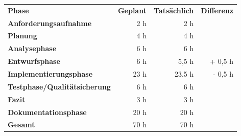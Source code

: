 \begin{tabu}{lrrr}
\rowfont{\bfseries\leavevmode\color{headingfont}}\textbf{Phase} & \textbf{Geplant} & \textbf{Tatsächlich} & \textbf{Differenz} \\
\textbf{Anforderungsaufnahme} & 2 h & 2 h & \\
\textbf{Planung} & 4 h & 4 h & \\ 
\textbf{Analysephase} & 6 h & 6 h  &  \\
\textbf{Entwurfsphase} & 6 h & 5,5 h & + 0,5 h \\
\textbf{Implementierungsphase} & 23 h  & 23.5 h  & - 0,5 h \\
\textbf{Testphase/Qualitätsicherung} & 6 h & 6 h & \\
\textbf{Fazit} & 3 h & 3 h & \\
\textbf{Dokumentationsphase} & 20 h & 20 h & \\
\hline
\hline
{}\textbf{Gesamt} & 70 h & 70 h & \\
\end{tabu}
